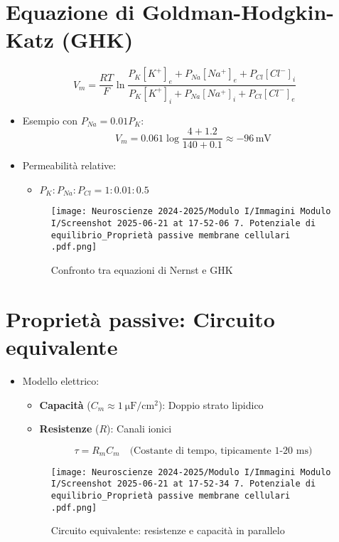 \documentclass{article}
\begin{document}
\section{Equazione di Goldman-Hodgkin-Katz (GHK)}
\[
V_m = \frac{RT}{F} \ln \frac{P_K[K^+]_e + P_{Na}[Na^+]_e + P_{Cl}[Cl^-]_i}{P_K[K^+]_i + P_{Na}[Na^+]_i + P_{Cl}[Cl^-]_e}
\]
\begin{itemize}
\item Esempio con \(P_{Na} = 0.01 P_K\):
\[
V_m = 0.061 \log \frac{4 + 1.2}{140 + 0.1} \approx -96 \, \text{mV}
\]

\item Permeabilità relative:
\begin{itemize}
\item \(P_K : P_{Na} : P_{Cl} = 1 : 0.01 : 0.5\)
\end{itemize}

\begin{figure}[h]
\centering
\texttt{[image: Neuroscienze 2024-2025/Modulo I/Immagini Modulo I/Screenshot 2025-06-21 at 17-52-06 7. Potenziale di equilibrio\_Proprietà passive membrane cellulari .pdf.png]}
\caption{Confronto tra equazioni di Nernst e GHK}
\label{fig:goldman}
\end{figure}
\end{itemize}

\section{Proprietà passive: Circuito equivalente}
\begin{itemize}
\item Modello elettrico:
\begin{itemize}
\item \textbf{Capacità} (\(C_m \approx \SI{1}{\micro\farad\per\centi\meter\squared}\)): Doppio strato lipidico
\item \textbf{Resistenze} (\(R\)): Canali ionici
\end{itemize}

\[
\tau = R_m C_m \quad \text{(Costante di tempo, tipicamente 1-20 ms)}
\]

\begin{figure}[h]
\centering
\texttt{[image: Neuroscienze 2024-2025/Modulo I/Immagini Modulo I/Screenshot 2025-06-21 at 17-52-34 7. Potenziale di equilibrio\_Proprietà passive membrane cellulari .pdf.png]}
\caption{Circuito equivalente: resistenze e capacità in parallelo}
\label{fig:circuito}
\end{figure}
\end{itemize}
\end{document}
